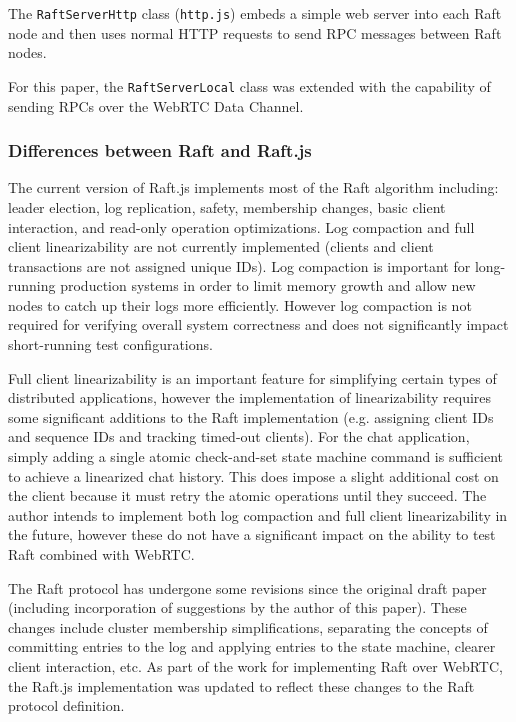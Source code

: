 \documentclass[conference,compsoc]{./IEEEtran/IEEEtran}
\begin{document}
The \texttt{RaftServerHttp} class (\texttt{http.js}) embeds a simple
web server into each Raft node and then uses normal HTTP requests to
send RPC messages between Raft nodes.

For this paper, the \texttt{RaftServerLocal} class was extended with
the capability of sending RPCs over the WebRTC Data Channel.

\subsubsection{Differences between Raft and Raft.js}

The current version of Raft.js implements most of the Raft algorithm
including: leader election, log replication, safety, membership
changes, basic client interaction, and read-only operation
optimizations. %
Log compaction and full client linearizability are not currently
implemented (clients and client transactions are not assigned unique
IDs). Log compaction is important for long-running production systems
in order to limit memory growth and allow new nodes to catch up their
logs more efficiently. However log compaction is not required for
verifying overall system correctness and does not significantly impact
short-running test configurations.

Full client linearizability is an important feature for simplifying
certain types of distributed applications, however the implementation
of linearizability requires some significant additions to the Raft
implementation (e.g. assigning client IDs and sequence IDs and
tracking timed-out clients). For the chat application, simply adding
a single atomic check-and-set state machine command is sufficient to
achieve a linearized chat history.  This does impose a slight
additional cost on the client because it must retry the atomic
operations until they succeed. The author intends to implement both
log compaction and full client linearizability in the future, however
these do not have a significant impact on the ability to test Raft
combined with WebRTC.

The Raft protocol has undergone some revisions since the original
draft paper \cite{raft_paper:ongaro14} (including incorporation of
suggestions by the author of this paper). These changes include
cluster membership simplifications, separating the concepts of
committing entries to the log and applying entries to the state
machine, clearer client interaction, etc. As part of the work for
implementing Raft over WebRTC, the Raft.js implementation was updated
to reflect these changes to the Raft protocol definition.
\end{document}
